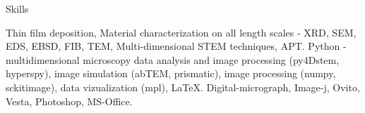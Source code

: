 
\begin{rubric}{Skills}

	Thin film deposition, Material characterization on all length scales - XRD, SEM, EDS, EBSD, FIB, TEM, Multi-dimensional STEM techniques, APT.
	Python - multidimensional microscopy data analysis and image processing (py4Dstem, hyperspy), image simulation (abTEM, prismatic), image processing (numpy, sckitimage), data vizualization (mpl), \LaTeX.
    Digital-micrograph,	Image-j, Ovito, Vesta, Photoshop, MS-Office.

\end{rubric}
